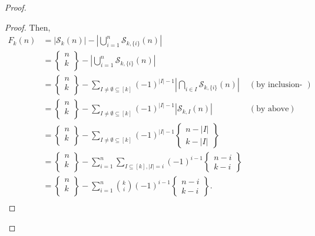 \documentclass{article}
\begin{document}
\begin{enumerate}[label={\bf Q\arabic*:}]
\begin{proof}
\begin{proof}
        Then,
        \begin{align*}
          F_k(n) &=|\mathcal{S}_k(n)| -\left|\bigcup_{i=1}^n
            \mathcal{S}_{k,\{i\}}(n)\right|\\
          &=\begin{Bmatrix}n\\k\\\end{Bmatrix} -\left|\bigcup_{i=1}^n
            \mathcal{S}_{k,\{i\}}(n)\right|\\
          &=\begin{Bmatrix}n\\k\\\end{Bmatrix}
            -\sum_{I\neq\emptyset\subseteq[k]} (-1)^{|I|-1}
            \left|\bigcap_{i\in I} \mathcal{S}_{k,\{i\}}(n)\right|
            &(\text{by inclusion-exclusion})\\
          &=\begin{Bmatrix}n\\k\\\end{Bmatrix}
            -\sum_{I\neq\emptyset\subseteq[k]} (-1)^{|I|-1}
            \left|\mathcal{S}_{k,I}(n)\right| &(\text{by above})\\
          &=\begin{Bmatrix}n\\k\\\end{Bmatrix}
            -\sum_{I\neq\emptyset\subseteq[k]} (-1)^{|I|-1}
            \begin{Bmatrix}n-|I|\\k-|I|\end{Bmatrix}\\
          &=\begin{Bmatrix}n\\k\\\end{Bmatrix}
            -\sum_{i=1}^n \sum_{I\subseteq[k],|I|=i} (-1)^{i-1}
            \begin{Bmatrix}n-i\\k-i\end{Bmatrix}\\
          &=\begin{Bmatrix}n\\k\\\end{Bmatrix}
            -\sum_{i=1}^n \binom{k}{i} (-1)^{i-1}
            \begin{Bmatrix}n-i\\k-i\end{Bmatrix}.\\
        \end{align*}
      \end{proof}
    \end{proof}


\end{enumerate}
\end{document}
